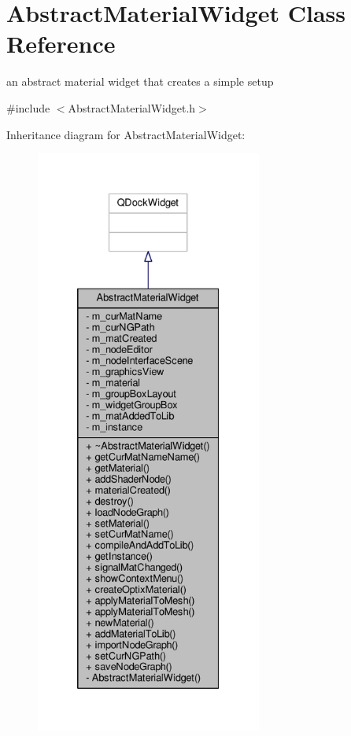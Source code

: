 \hypertarget{class_abstract_material_widget}{\section{Abstract\-Material\-Widget Class Reference}
\label{class_abstract_material_widget}
}


an abstract material widget that creates a simple setup  




{\ttfamily \#include $<$Abstract\-Material\-Widget.\-h$>$}



Inheritance diagram for Abstract\-Material\-Widget\-:
\nopagebreak
\begin{figure}[H]
\begin{center}
\leavevmode
\includegraphics[height=550pt]{class_abstract_material_widget__inherit__graph}
\end{center}
\end{figure}


